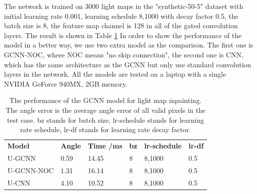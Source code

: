 \documentclass[border=15pt, multi, tikz]{article}
\newcommand{\tabhead}[1]{\textbf{#1}}
\begin{document}
The network is trained on 3000 light maps in the "synthetic-50-5" dataset with initial learning rate 0.001, learning schedule 8,1000 with decay factor 0.5, the batch size is 8, the feature map channel is 128 in all of the gated convolution layers. The result is shown in Table \ref{tab:light-inpainting} In order to show the performance of the model in a better way, we use two extra model as the comparison. The first one is GCNN-NOC, where NOC means "no skip connection", the second one is CNN, which has the same architecture as the GCNN but only use standard convolution layers in the network. All the models are tested on a laptop with a single NVIDIA GeForce 940MX, 2GB memory.
\begin{table}[th]
	
	\centering
	\begin{tabular}{l l l l l l }
		\tabhead{Model} & \tabhead{Angle} & \tabhead{Time /ms} & \tabhead{bz} & \tabhead{lr-schedule} & \tabhead{lr-df}\\
		U-GCNN  & 0.59  & 14.45 & 8 & 8,1000 & 0.5\\ 
		\hline
		U-GCNN-NOC & 1.31 & 16.14 & 8 & 8,1000 & 0.5\\
		\hline
		U-CNN & 4.10 & 10.52 & 8 & 8,1000 & 0.5\\
	\end{tabular}
	\caption{The performance of the GCNN model for light map inpainting. The angle error is the average angle error of all valid pixels in the test case. bz stands for batch size, lr-schedule stands for learning rate schedule, lr-df stands for learning rate decay factor.}	
	\label{tab:light-inpainting}
\end{table}
\end{document}
